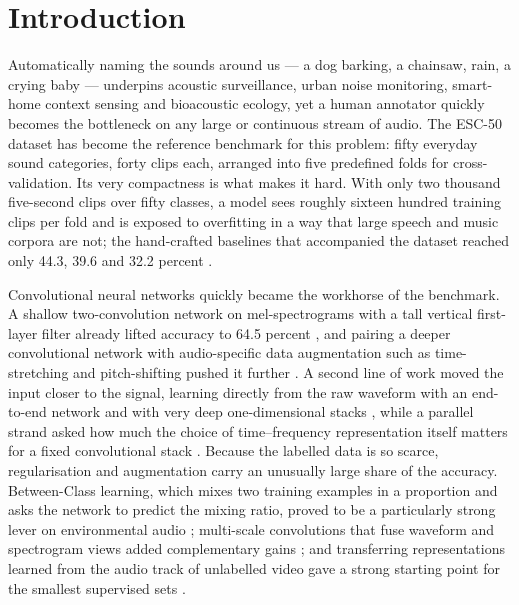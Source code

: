 \documentclass[conference]{IEEEtran}
\begin{document}
\section{Introduction}
Automatically naming the sounds around us --- a dog barking, a chainsaw, rain, a crying baby --- underpins acoustic surveillance, urban noise monitoring, smart-home context sensing and bioacoustic ecology, yet a human annotator quickly becomes the bottleneck on any large or continuous stream of audio. The ESC-50 dataset \cite{piczak_dataset} has become the reference benchmark for this problem: fifty everyday sound categories, forty clips each, arranged into five predefined folds for cross-validation. Its very compactness is what makes it hard. With only two thousand five-second clips over fifty classes, a model sees roughly sixteen hundred training clips per fold and is exposed to overfitting in a way that large speech and music corpora are not; the hand-crafted baselines that accompanied the dataset reached only 44.3, 39.6 and 32.2 percent \cite{piczak_dataset}.

Convolutional neural networks quickly became the workhorse of the benchmark. A shallow two-convolution network on mel-spectrograms with a tall vertical first-layer filter already lifted accuracy to 64.5 percent \cite{piczak_cnn}, and pairing a deeper convolutional network with audio-specific data augmentation such as time-stretching and pitch-shifting pushed it further \cite{salamon_bello}. A second line of work moved the input closer to the signal, learning directly from the raw waveform with an end-to-end network \cite{tokozume_envnet} and with very deep one-dimensional stacks \cite{dai_rawwaveform}, while a parallel strand asked how much the choice of time--frequency representation itself matters for a fixed convolutional stack \cite{huzaifah_tf}. Because the labelled data is so scarce, regularisation and augmentation carry an unusually large share of the accuracy. Between-Class learning, which mixes two training examples in a proportion and asks the network to predict the mixing ratio, proved to be a particularly strong lever on environmental audio \cite{tokozume_bc}; multi-scale convolutions that fuse waveform and spectrogram views added complementary gains \cite{zhu_multiscale}; and transferring representations learned from the audio track of unlabelled video gave a strong starting point for the smallest supervised sets \cite{aytar_soundnet}.
\end{document}
